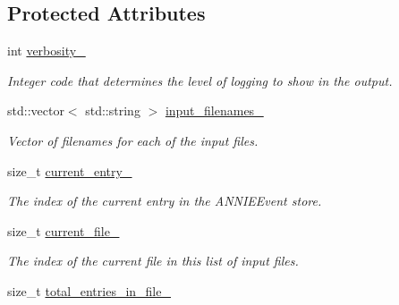 \subsection*{Protected Attributes}
\begin{DoxyCompactItemize}
\item 
\hypertarget{classLoadANNIEEvent_a1c9892604bb47cb58be2e7b6214ac773}{
int \hyperlink{classLoadANNIEEvent_a1c9892604bb47cb58be2e7b6214ac773}{verbosity\_\-}}
\label{classLoadANNIEEvent_a1c9892604bb47cb58be2e7b6214ac773}

\begin{DoxyCompactList}\small\item\em Integer code that determines the level of logging to show in the output. \item\end{DoxyCompactList}\item 
\hypertarget{classLoadANNIEEvent_a5de84624994fa2f83892fa7ad192c954}{
std::vector$<$ std::string $>$ \hyperlink{classLoadANNIEEvent_a5de84624994fa2f83892fa7ad192c954}{input\_\-filenames\_\-}}
\label{classLoadANNIEEvent_a5de84624994fa2f83892fa7ad192c954}

\begin{DoxyCompactList}\small\item\em Vector of filenames for each of the input files. \item\end{DoxyCompactList}\item 
\hypertarget{classLoadANNIEEvent_a9037abdb3ca42bcb45da4f76eaa5497f}{
size\_\-t \hyperlink{classLoadANNIEEvent_a9037abdb3ca42bcb45da4f76eaa5497f}{current\_\-entry\_\-}}
\label{classLoadANNIEEvent_a9037abdb3ca42bcb45da4f76eaa5497f}

\begin{DoxyCompactList}\small\item\em The index of the current entry in the ANNIEEvent store. \item\end{DoxyCompactList}\item 
\hypertarget{classLoadANNIEEvent_a92adda94f9be56cfb8a6507aa64d16f6}{
size\_\-t \hyperlink{classLoadANNIEEvent_a92adda94f9be56cfb8a6507aa64d16f6}{current\_\-file\_\-}}
\label{classLoadANNIEEvent_a92adda94f9be56cfb8a6507aa64d16f6}

\begin{DoxyCompactList}\small\item\em The index of the current file in this list of input files. \item\end{DoxyCompactList}\item 
\hypertarget{classLoadANNIEEvent_aabbd70eb8db780eb690f58cf76b7178e}{
size\_\-t \hyperlink{classLoadANNIEEvent_aabbd70eb8db780eb690f58cf76b7178e}{total\_\-entries\_\-in\_\-file\_\-}}
\label{classLoadANNIEEvent_aabbd70eb8db780eb690f58cf76b7178e}


\end{DoxyCompactItemize}
